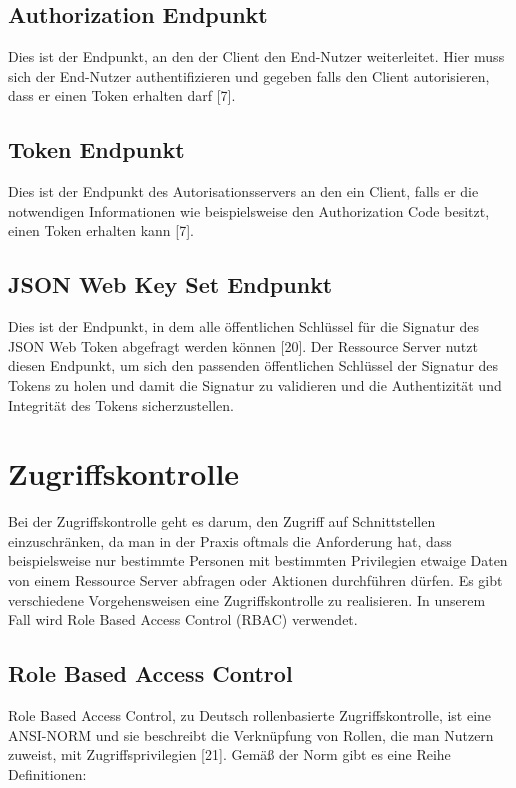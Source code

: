 \subsection{Authorization Endpunkt}
\label{sec:OAuth2EndpunktedesAutorisationsservers:AuthorizationEndpunkt}
Dies ist der Endpunkt, an den der Client den End-Nutzer weiterleitet. Hier muss sich der 
End-Nutzer authentifizieren und gegeben falls den Client autorisieren, dass er einen Token erhalten darf [7].

\subsection{Token Endpunkt}
\label{sec:OAuth2EndpunktedesAutorisationsservers:TokenEndpunkt}
Dies ist der Endpunkt des Autorisationsservers an den ein Client, falls er die notwendigen 
Informationen wie beispielsweise den Authorization Code besitzt, einen Token erhalten 
kann [7].

\subsection{JSON Web Key Set Endpunkt}
\label{sec:OAuth2EndpunktedesAutorisationsservers:JSONWebKeySet(JWKS)Endpunkt}
Dies ist der Endpunkt, in dem alle öffentlichen Schlüssel für die Signatur des JSON Web 
Token abgefragt werden können [20]. Der Ressource Server nutzt diesen Endpunkt, um sich 
den passenden öffentlichen Schlüssel der Signatur des Tokens zu holen und damit die 
Signatur zu validieren und die Authentizität und Integrität des Tokens sicherzustellen.

\section{Zugriffskontrolle}
\label{sec:Zugriffskontrolle}
Bei der Zugriffskontrolle geht es darum, den Zugriff auf Schnittstellen einzuschränken, da 
man in der Praxis oftmals die Anforderung hat, dass beispielsweise nur bestimmte 
Personen mit bestimmten Privilegien etwaige Daten von einem Ressource Server abfragen 
oder Aktionen durchführen dürfen.
Es gibt verschiedene Vorgehensweisen eine Zugriffskontrolle zu realisieren. In unserem Fall 
wird Role Based Access Control (RBAC) verwendet. 

\subsection{Role Based Access Control}
\label{sec:Zugriffskontrolle:RoleBasedAccessControl(RBAC)}
Role Based Access Control, zu Deutsch rollenbasierte Zugriffskontrolle, ist eine ANSI-NORM 
und sie beschreibt die Verknüpfung von Rollen, die man Nutzern zuweist, mit 
Zugriffsprivilegien [21]. Gemäß der Norm gibt es eine Reihe Definitionen:

